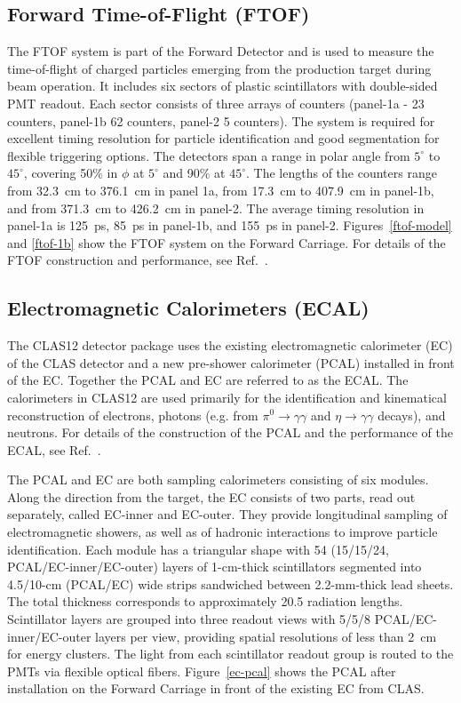 \documentclass[final,3p,twocolumn]{elsarticle}
\begin{document}
\subsection{Forward Time-of-Flight (FTOF)}
\label{ftof}

The FTOF system is part of the Forward Detector and is used to measure the time-of-flight of charged particles 
emerging from the production target during beam operation. It includes six sectors of plastic scintillators with 
double-sided PMT readout. Each sector consists of three arrays of counters (panel-1a - 23 counters, panel-1b 62
counters, panel-2 5 counters). The system is required for excellent timing resolution for particle identification and
good segmentation for flexible triggering options. The detectors span a range in polar angle from $5^\circ$ to
$45^\circ$, covering 50\% in $\phi$ at $5^\circ$ and 90\% at $45^\circ$. The lengths of the counters range from
32.3~cm to 376.1~cm in panel 1a, from 17.3~cm to 407.9~cm in panel-1b, and from 371.3~cm to 426.2~cm in panel-2.
The average timing resolution in panel-1a is 125~ps, 85~ps in panel-1b, and 155~ps in panel-2.
Figures~\ref{ftof-model} and \ref{ftof-1b} show the FTOF system on the Forward Carriage. For details of the
FTOF construction and performance, see Ref.~\cite{FTOF}. 

\subsection{Electromagnetic Calorimeters (ECAL)}

The CLAS12 detector package uses the existing electromagnetic calorimeter (EC) of the CLAS detector
\cite{Amarian:2001zs} and a new pre-shower calorimeter (PCAL) installed in front of the EC. Together the
PCAL and EC are referred to as the ECAL. The calorimeters in CLAS12 are used primarily for the identification
and kinematical reconstruction of electrons, photons (e.g. from $\pi^0 \to \gamma \gamma$ and
$\eta \to \gamma  \gamma$ decays), and neutrons. For details of the construction of the PCAL and the
performance of the ECAL, see Ref.~\cite{ECAL}. 

The PCAL and EC are both sampling calorimeters consisting of six modules. Along the direction from the target,
the EC consists of two parts, read out separately, called EC-inner and EC-outer. They provide longitudinal sampling
of electromagnetic showers, as well as of hadronic interactions to improve particle identification. Each module has a
triangular shape with 54 (15/15/24, PCAL/EC-inner/EC-outer) layers of 1-cm-thick scintillators segmented into
4.5/10-cm (PCAL/EC) wide strips sandwiched between 2.2-mm-thick lead sheets. The total thickness corresponds to
approximately 20.5 radiation lengths. Scintillator layers are grouped into three readout views with 5/5/8
PCAL/EC-inner/EC-outer layers per view, providing spatial resolutions of less than 2~cm for energy clusters. The
light from each scintillator readout group is routed to the PMTs via flexible optical fibers. Figure~\ref{ec-pcal}
shows the PCAL after installation on the Forward Carriage in front of the existing EC from CLAS.
\end{document}
